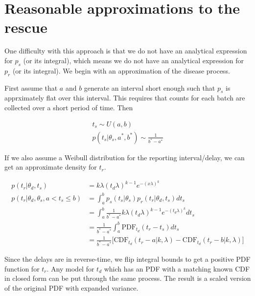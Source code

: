 \section{Reasonable approximations to the rescue}

One difficulty with this approach is that we do not have an analytical
expression for $p_s$ (or its integral), which means we do not
have an analytical expression for $p_r$ (or its integral).  We begin
with an approximation of the disease process.  

First assume that $a$ and $b$ generate an interval short enough such
that $p_s$ is apprximately flat over this interval.  This requires that
counts for each batch are collected over a short period of time.  Then 

\begin{align}
t_s \sim U(a,b) \\
p(t_s|\theta_s, a^*, b^*) \sim \frac{1}{b^* - a^*}
\end{align}

If we also assume a Weibull distribution for the reporting
interval/delay, we can get an approximate density for $t_r$.

\begin{align}
p(t_r| \theta_d, t_s) &= k\lambda(t_d\lambda)^{k-1} e^{-(x\lambda)^k} \\
p(t_r| \theta_d, \theta_s, a < t_s \le  b) 
		&= \int_a^b p_s(t_s|\theta_s) p_r(t_r|\theta_d, t_s) dt_s\\
		&= \int_a^b \frac{1}{b^*-a^*} k\lambda(t_d\lambda)^{k-1} e^{-(t_d\lambda)^k} dt_s\\
		&= \frac{1}{b^*-a^*} \int_a^b \text{PDF}_{t_d}(t_r - t_s) dt_s\\
		&= \frac{1}{b^*-a^*} \big[ \text{CDF}_{t_d}(t_r-a|k,\lambda) - \text{CDF}_{t_d}(t_r-b|k,\lambda) \big]
\end{align}

Since the delays are in reverse-time, we flip integral bounds to get a positive
PDF function for $t_r$. Any model for $t_d$ which has an PDF with a
matching known CDF in closed form can be put through the same process.
The result is a scaled version of the original PDF with expanded
variance.



